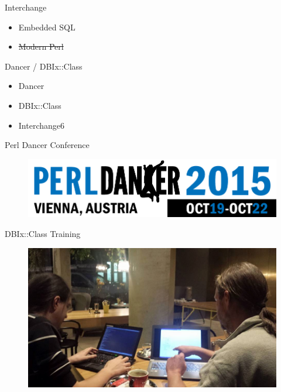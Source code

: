 \begin{frame}{Interchange}
\begin{itemize}
\item Embedded SQL
\item \sout{Modern Perl}
\end{itemize}
\end{frame}

\begin{frame}{Dancer / DBIx::Class}
\begin{itemize}
\item Dancer
\item DBIx::Class
\item Interchange6
\end{itemize}
\end{frame}


\begin{frame}{Perl Dancer Conference}
\begin{figure}[!ht]
\centering
\includegraphics[width=1\linewidth]{img/perl-dancer-homepage-logo.png}
\end{figure}
\end{frame}


\begin{frame}{DBIx::Class Training}
\begin{figure}[!ht]
\centering
\includegraphics[width=1\linewidth]{img/training-preps.jpg}
\end{figure}
\end{frame}

